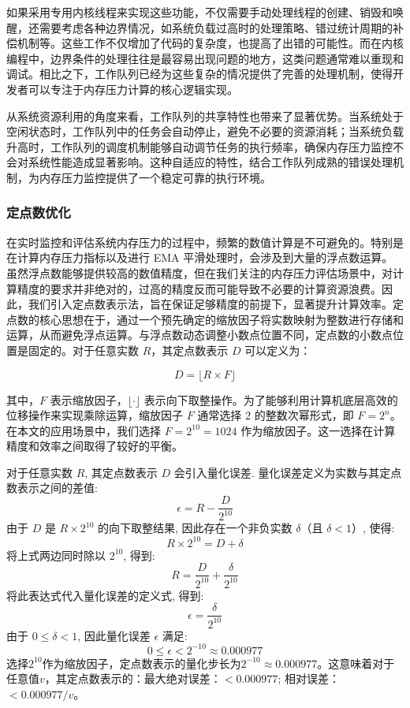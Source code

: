 如果采用专用内核线程来实现这些功能，不仅需要手动处理线程的创建、销毁和唤醒，还需要考虑各种边界情况，如系统负载过高时的处理策略、错过统计周期的补偿机制等。这些工作不仅增加了代码的复杂度，也提高了出错的可能性。而在内核编程中，边界条件的处理往往是最容易出现问题的地方，这类问题通常难以重现和调试。相比之下，工作队列已经为这些复杂的情况提供了完善的处理机制，使得开发者可以专注于内存压力计算的核心逻辑实现。

从系统资源利用的角度来看，工作队列的共享特性也带来了显著优势。当系统处于空闲状态时，工作队列中的任务会自动停止，避免不必要的资源消耗；当系统负载升高时，工作队列的调度机制能够自动调节任务的执行频率，确保内存压力监控不会对系统性能造成显著影响。这种自适应的特性，结合工作队列成熟的错误处理机制，为内存压力监控提供了一个稳定可靠的执行环境。

\subsubsection{定点数优化}


在实时监控和评估系统内存压力的过程中，频繁的数值计算是不可避免的。特别是在计算内存压力指标以及进行 EMA 平滑处理时，会涉及到大量的浮点数运算。虽然浮点数能够提供较高的数值精度，但在我们关注的内存压力评估场景中，对计算精度的要求并非绝对的，过高的精度反而可能导致不必要的计算资源浪费。因此，我们引入定点数表示法，旨在保证足够精度的前提下，显著提升计算效率。定点数的核心思想在于，通过一个预先确定的缩放因子将实数映射为整数进行存储和运算，从而避免浮点运算。与浮点数动态调整小数点位置不同，定点数的小数点位置是固定的。对于任意实数 \(R\)，其定点数表示 \(D\) 可以定义为：

\[
D = \lfloor R \times F \rfloor
\]

其中，\(F\) 表示缩放因子，\(\lfloor \cdot \rfloor\) 表示向下取整操作。为了能够利用计算机底层高效的位移操作来实现乘除运算，缩放因子 \(F\) 通常选择 2 的整数次幂形式，即 \(F = 2^n\)。在本文的应用场景中，我们选择 \(F = 2^{10} = 1024\) 作为缩放因子。这一选择在计算精度和效率之间取得了较好的平衡。

对于任意实数 \(R\), 其定点数表示 \(D\) 会引入量化误差. 量化误差定义为实数与其定点数表示之间的差值:
\[
\epsilon = R - \frac{D}{2^{10}}
\]
由于 \(D\) 是 \(R \times 2^{10}\) 的向下取整结果, 因此存在一个非负实数 \(\delta\)（且 \(\delta < 1\)）, 使得:
\[
R \times 2^{10} = D + \delta
\]
将上式两边同时除以 \(2^{10}\), 得到:
\[
R = \frac{D}{2^{10}} + \frac{\delta}{2^{10}}
\]
将此表达式代入量化误差的定义式, 得到:
\[
\epsilon = \frac{\delta}{2^{10}}
\]
由于 \(0 \leq \delta < 1\), 因此量化误差 \(\epsilon\) 满足:
\[
0 \leq \epsilon < 2^{-10} \approx 0.000977
\]
选择\(2^{10}\)作为缩放因子，定点数表示的量化步长为\(2^{-10} \approx 0.000977\)。这意味着对于任意值\(v\)，其定点数表示的：最大绝对误差：\(< 0.000977\); 相对误差：\(< 0.000977/v\)。

